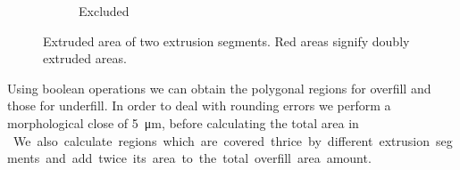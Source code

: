 \begin{figure}
\begin{subfigure}{\figwidth}
\caption{Excluded}\label{segment_visualization_excluded}
\end{subfigure}
\caption{
Extruded area of two extrusion segments.
Red areas signify doubly extruded areas.
}
\label{segment_visualization}
\end{figure}

Using boolean operations we can obtain the polygonal regions for overfill and those for underfill.
In order to deal with rounding errors we perform a morphological close of \SI{5}{\micro\meter}, before calculating the total area in \si{\milli\meter\square}.
We also calculate regions which are covered thrice by different extrusion segments and add twice its area to the total overfill area amount.

